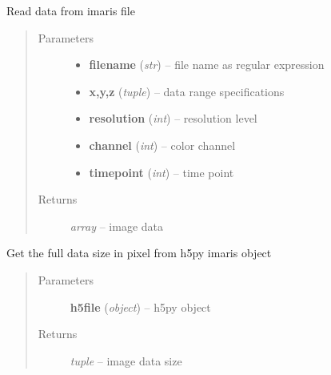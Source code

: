 \documentclass[letterpaper,10pt,english]{sphinxmanual}
\begin{document}
\begin{fulllineitems}
\label{api/ClearMap.IO:ClearMap.IO.Imaris.readData}
Read data from imaris file
\begin{quote}\begin{description}
\item[{Parameters}] \leavevmode\begin{itemize}
\item {} 
\textbf{filename} (\emph{str}) --
file name as regular expression

\item {} 
\textbf{x,y,z} (\emph{tuple}) --
data range specifications

\item {} 
\textbf{resolution} (\emph{int}) --
resolution level

\item {} 
\textbf{channel} (\emph{int}) --
color channel

\item {} 
\textbf{timepoint} (\emph{int}) --
time point

\end{itemize}

\item[{Returns}] \leavevmode
\emph{array} --
image data

\end{description}\end{quote}

\end{fulllineitems}


\begin{fulllineitems}
\label{api/ClearMap.IO:ClearMap.IO.Imaris.getDataSize}
Get the full data size in pixel from h5py imaris object
\begin{quote}\begin{description}
\item[{Parameters}] \leavevmode
\textbf{h5file} (\emph{object}) --
h5py object

\item[{Returns}] \leavevmode
\emph{tuple} --
image data size

\end{description}\end{quote}

\end{fulllineitems}
\end{document}

